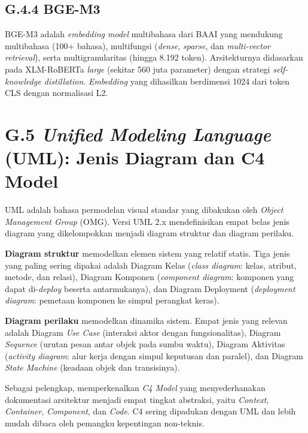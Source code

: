 \subsection*{G.4.4 BGE-M3}

BGE-M3 \citep{chenBGEM32024} adalah \textit{embedding model} multibahasa dari BAAI yang mendukung multibahasa (100+ bahasa), multifungsi (\textit{dense}, \textit{sparse}, dan \textit{multi-vector retrieval}), serta multigranularitas (hingga 8.192 token). Arsitekturnya didasarkan pada XLM-RoBERTa \textit{large} (sekitar 560 juta parameter) dengan strategi \textit{self-knowledge distillation}. \textit{Embedding} yang dihasilkan berdimensi 1024 dari token CLS dengan normalisasi L2.

\section*{G.5 \textit{Unified Modeling Language} (UML): Jenis Diagram dan C4 Model}
\label{app:uml-detail}

UML \citep{boochUML2005} adalah bahasa permodelan visual standar yang dibakukan oleh \textit{Object Management Group} (OMG). Versi UML 2.x mendefinisikan empat belas jenis diagram yang dikelompokkan menjadi diagram struktur dan diagram perilaku.

\textbf{Diagram struktur} memodelkan elemen sistem yang relatif statis. Tiga jenis yang paling sering dipakai adalah Diagram Kelas (\textit{class diagram}: kelas, atribut, metode, dan relasi), Diagram Komponen (\textit{component diagram}: komponen yang dapat di-\textit{deploy} beserta antarmukanya), dan Diagram Deployment (\textit{deployment diagram}: pemetaan komponen ke simpul perangkat keras).

\textbf{Diagram perilaku} memodelkan dinamika sistem. Empat jenis yang relevan adalah Diagram \textit{Use Case} (interaksi aktor dengan fungsionalitas), Diagram \textit{Sequence} (urutan pesan antar objek pada sumbu waktu), Diagram Aktivitas (\textit{activity diagram}: alur kerja dengan simpul keputusan dan paralel), dan Diagram \textit{State Machine} (keadaan objek dan transisinya).

Sebagai pelengkap, \citet{brownC42018} memperkenalkan \textit{C4 Model} yang menyederhanakan dokumentasi arsitektur menjadi empat tingkat abstraksi, yaitu \textit{Context}, \textit{Container}, \textit{Component}, dan \textit{Code}. C4 sering dipadukan dengan UML dan lebih mudah dibaca oleh pemangku kepentingan non-teknis.

